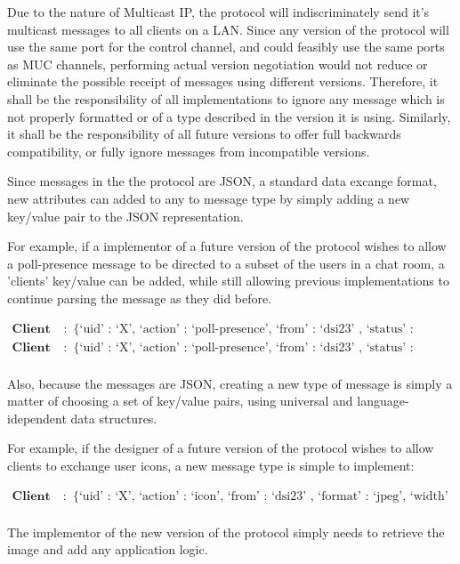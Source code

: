 \documentclass{article}
\begin{document}
Due to the nature of Multicast IP, the protocol will indiscriminately send it's
multicast messages to all clients on a LAN. Since any version of the protocol
will use the same port for the control channel, and could feasibly use the same
ports as MUC channels, performing actual version negotiation would not reduce or
eliminate the possible receipt of messages using different versions. Therefore,
it shall be the responsibility of all implementations to ignore any message
which is not properly formatted or of a type described in the version it is
using. Similarly, it shall be the responsibility of all future versions to offer
full backwards compatibility, or fully ignore messages from incompatible
versions.

Since messages in the the protocol are JSON, a standard data excange format, new 
attributes can added to any to message type by simply adding a new key/value pair
to the JSON representation.

For example, if a implementor of a future version of the protocol wishes to allow
a poll-presence message to be directed to a subset of the users in a chat room, a
'clients' key/value can be added, while still allowing previous implementations to
continue parsing the message as they did before.

\begin{align*}
\textbf{Client A}:& \text{\{ `uid' : `X', `action' : `poll-presence', `from' :
`dsi23' , `status' : `online' \}} \\
\textbf{Client A}:& \text{\{ `uid' : `X', `action' : `poll-presence', `from' :
`dsi23' , `status' : `online', `clients' : ['bb482','cek47'] \}} \\
\end{align*}

Also, because the messages are JSON, creating a new type of message is simply
a matter of choosing a set of key/value pairs, using universal and language-idependent
data structures.

For example, if the designer of a future version of the protocol wishes to allow clients
to exchange user icons, a new message type is simple to implement:

\begin{align*}
\textbf{Client A}:& \text{\{ `uid' : `X', `action' : `icon', `from' :
`dsi23' , `format' : `jpeg', `width' : `50px', `height' : `50px', `image' : `...' \}} \\
\end{align*}

The implementor of the new version of the protocol simply needs to 
retrieve the image and add any application logic.
\end{document}
